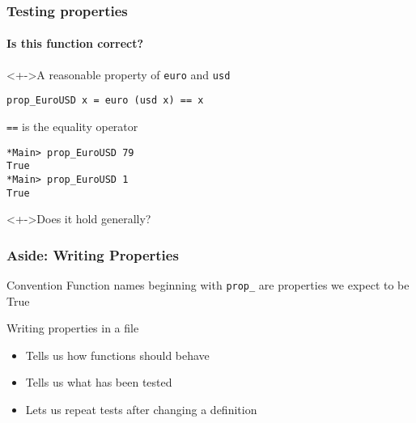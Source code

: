 \documentclass{beamer}
\begin{document}
\begin{frame}[fragile]
  \frametitle{Testing properties}
  \framesubtitle{Is this function correct?}
  \begin{block}<+->{A reasonable property of \texttt{euro} and \texttt{usd}}
\begin{verbatim}
prop_EuroUSD x = euro (usd x) == x
\end{verbatim}
    \texttt{==} is the equality operator
\begin{verbatim}
*Main> prop_EuroUSD 79
True
*Main> prop_EuroUSD 1
True
\end{verbatim}
  \end{block}
  \begin{alertblock}<+->{Does it hold generally?}
    
  \end{alertblock}
\end{frame}
\begin{frame}[fragile]
  \frametitle{Aside: Writing Properties}
  \begin{block}{Convention}
    Function names beginning with
    \verb|prop_| are properties we expect to be True 
  \end{block}
  \begin{block}{Writing properties in a file}
    \begin{itemize}
    \item Tells us how functions should behave 
    \item Tells us what has been tested 
    \item Lets us repeat tests after changing a definition 
    \end{itemize}
  \end{block}
\end{frame}
\end{document}

